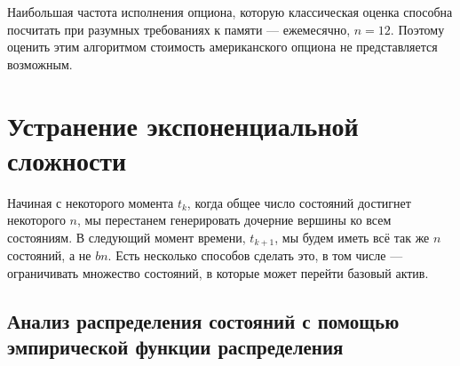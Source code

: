 \documentclass[specialist,
               substylefile = spbu.rtx,
               subf,href,colorlinks=true, 12pt]{disser}
\begin{document}
	\par Наибольшая частота исполнения опциона, которую классическая оценка способна посчитать при разумных требованиях к памяти --- ежемесячно, $n=12$. Поэтому оценить этим алгоритмом стоимость американского опциона не представляется возможным.

\chapter{Устранение экспоненциальной сложности}
	\par Начиная с некоторого момента $t_k$, когда общее число состояний достигнет некоторого $n$, мы перестанем генерировать дочерние вершины ко всем состояниям. В следующий момент времени, $t_{k+1}$, мы будем иметь всё так же $n$ состояний, а не $bn$. Есть несколько способов сделать это, в том числе --- ограничивать множество состояний, в которые может перейти базовый актив.
	\section{Анализ распределения состояний с помощью эмпирической функции распределения}
\end{document}
